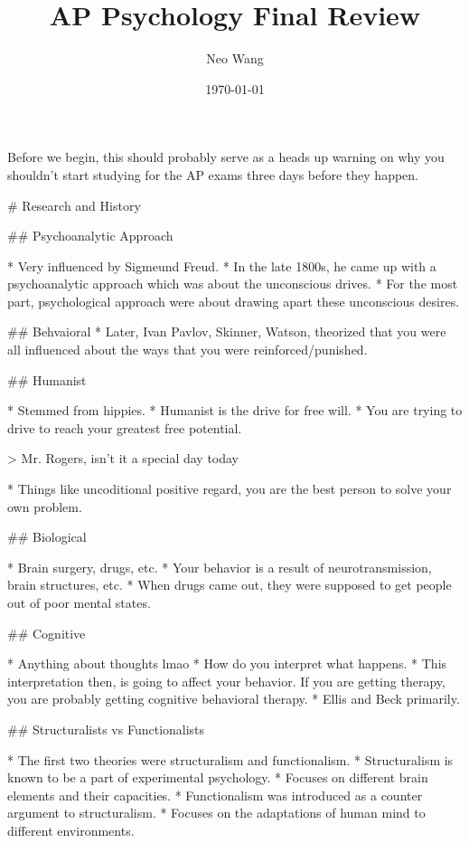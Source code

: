 \documentclass{article}
\title{AP Psychology Final Review}
\author{Neo Wang}
\date{\today}
\begin{document}
\maketitle

Before we begin, this should probably serve as a heads up warning on why you shouldn't start studying for the AP exams three days before they happen.

\tableofcontents

\begin{markdown}

# Research and History

## Psychoanalytic Approach

* Very influenced by Sigmeund Freud.
* In the late 1800s, he came up with a psychoanalytic approach which was about the unconscious drives.
* For the most part, psychological approach were about drawing apart these unconscious desires.

## Behvaioral
* Later, Ivan Pavlov, Skinner, Watson, theorized that you were all influenced about the ways that you were reinforced/punished.

## Humanist

* Stemmed from hippies.
* Humanist is the drive for free will.
* You are trying to drive to reach your greatest free potential.

> Mr. Rogers, isn't it a special day today

* Things like uncoditional positive regard, you are the best person to solve your own problem.

## Biological

* Brain surgery, drugs, etc.
* Your behavior is a result of neurotransmission, brain structures, etc.
* When drugs came out, they were supposed to get people out of poor mental states.

## Cognitive

* Anything about thoughts lmao
* How do you interpret what happens.
* This interpretation then, is going to affect your behavior. If you are getting therapy, you are probably getting cognitive behavioral therapy.
* Ellis and Beck primarily.

## Structuralists vs Functionalists

* The first two theories were structuralism and functionalism.
* Structuralism is known to be a part of experimental psychology.
	* Focuses on different brain elements and their capacities.
* Functionalism was introduced as a counter argument to structuralism.
	* Focuses on the adaptations of human mind to different environments.


\end{markdown}
\end{document}
